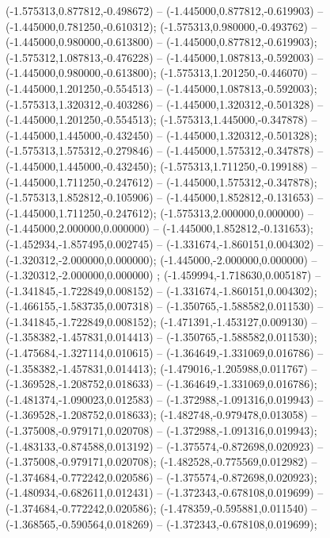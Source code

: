  (-1.575313,0.877812,-0.498672) -- (-1.445000,0.877812,-0.619903) -- (-1.445000,0.781250,-0.610312);
 (-1.575313,0.980000,-0.493762) -- (-1.445000,0.980000,-0.613800) -- (-1.445000,0.877812,-0.619903);
 (-1.575312,1.087813,-0.476228) -- (-1.445000,1.087813,-0.592003) -- (-1.445000,0.980000,-0.613800);
 (-1.575313,1.201250,-0.446070) -- (-1.445000,1.201250,-0.554513) -- (-1.445000,1.087813,-0.592003);
 (-1.575313,1.320312,-0.403286) -- (-1.445000,1.320312,-0.501328) -- (-1.445000,1.201250,-0.554513);
 (-1.575313,1.445000,-0.347878) -- (-1.445000,1.445000,-0.432450) -- (-1.445000,1.320312,-0.501328);
 (-1.575313,1.575312,-0.279846) -- (-1.445000,1.575312,-0.347878) -- (-1.445000,1.445000,-0.432450);
 (-1.575313,1.711250,-0.199188) -- (-1.445000,1.711250,-0.247612) -- (-1.445000,1.575312,-0.347878);
 (-1.575313,1.852812,-0.105906) -- (-1.445000,1.852812,-0.131653) -- (-1.445000,1.711250,-0.247612);
 (-1.575313,2.000000,0.000000) -- (-1.445000,2.000000,0.000000) -- (-1.445000,1.852812,-0.131653);
 (-1.452934,-1.857495,0.002745) -- (-1.331674,-1.860151,0.004302) -- (-1.320312,-2.000000,0.000000);
 (-1.445000,-2.000000,0.000000) -- (-1.320312,-2.000000,0.000000) ;
 (-1.459994,-1.718630,0.005187) -- (-1.341845,-1.722849,0.008152) -- (-1.331674,-1.860151,0.004302);
 (-1.466155,-1.583735,0.007318) -- (-1.350765,-1.588582,0.011530) -- (-1.341845,-1.722849,0.008152);
 (-1.471391,-1.453127,0.009130) -- (-1.358382,-1.457831,0.014413) -- (-1.350765,-1.588582,0.011530);
 (-1.475684,-1.327114,0.010615) -- (-1.364649,-1.331069,0.016786) -- (-1.358382,-1.457831,0.014413);
 (-1.479016,-1.205988,0.011767) -- (-1.369528,-1.208752,0.018633) -- (-1.364649,-1.331069,0.016786);
 (-1.481374,-1.090023,0.012583) -- (-1.372988,-1.091316,0.019943) -- (-1.369528,-1.208752,0.018633);
 (-1.482748,-0.979478,0.013058) -- (-1.375008,-0.979171,0.020708) -- (-1.372988,-1.091316,0.019943);
 (-1.483133,-0.874588,0.013192) -- (-1.375574,-0.872698,0.020923) -- (-1.375008,-0.979171,0.020708);
 (-1.482528,-0.775569,0.012982) -- (-1.374684,-0.772242,0.020586) -- (-1.375574,-0.872698,0.020923);
 (-1.480934,-0.682611,0.012431) -- (-1.372343,-0.678108,0.019699) -- (-1.374684,-0.772242,0.020586);
 (-1.478359,-0.595881,0.011540) -- (-1.368565,-0.590564,0.018269) -- (-1.372343,-0.678108,0.019699);
